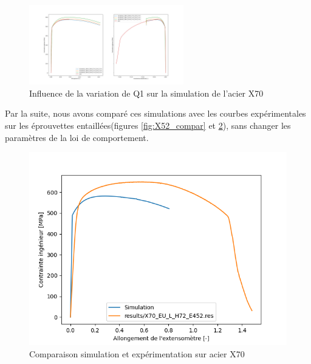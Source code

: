 \documentclass[a4paper, french, 11pt, draft]{article}
\begin{document}
    \begin{figure}[hbt]
        \includegraphics[width=0.6\textwidth]{image/INFLUENCE/X70_Q1_var.png}
        \centering
        \caption{Influence de la variation de Q1 sur la simulation de l'acier X70}
        \label{fig:X70_Q1var}
    \end{figure}

    Par la suite, nous avons comparé ces simulations avec les courbes expérimentales sur les éprouvettes entaillées(figures \ref{fig:X52_compar} et \ref{fig:X70_compar}), sans changer les paramètres de la loi de comportement.

    \begin{figure}[ht]
        \includegraphics{image/INFLUENCE/X70_comparaison.png}
        \centering
        \caption{Comparaison simulation et expérimentation sur acier X70}
        \label{fig:X70_compar}
    \end{figure}
    
\end{document}
